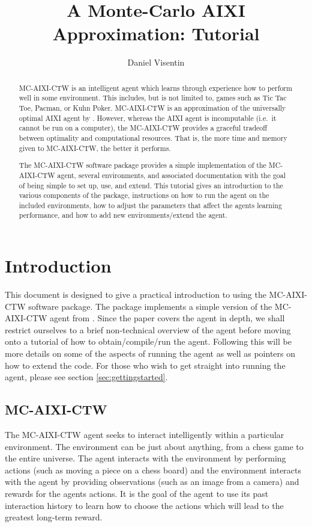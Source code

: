 \documentclass[a4paper,11pt]{article}
\title{A Monte-Carlo AIXI Approximation: Tutorial}
\author{Daniel Visentin}
\begin{document}
\maketitle 

\tableofcontents

\newpage

\begin{abstract}
  MC-AIXI-CTW is an intelligent agent which learns through experience how to perform well in some environment. This includes, but is not limited to, games such as Tic Tac Toe, Pacman, or Kuhn Poker. MC-AIXI-CTW is an approximation of the universally optimal AIXI agent by \cite{hutter2005universal}. However, whereas the AIXI agent is incomputable (i.e.~it cannot be run on a computer), the MC-AIXI-CTW provides a graceful tradeoff between optimality and computational resources. That is, the more time and memory given to MC-AIXI-CTW, the better it performs.

The MC-AIXI-CTW software package provides a simple implementation of the MC-AIXI-CTW agent, several environments, and associated documentation with the goal of being simple to set up, use, and extend. This tutorial gives an introduction to the various components of the package, instructions on how to run the agent on the included environments, how to adjust the parameters that affect the agents learning performance, and how to add new environments/extend the agent.

\end{abstract}

\section{Introduction}
This document is designed to give a practical introduction to using the MC-AIXI-CTW software package. The package implements a simple version of the MC-AIXI-CTW agent from \cite{Hutter:11aixictwx}. Since the paper covers the agent in depth, we shall restrict ourselves to a brief non-technical overview of the agent before moving onto a tutorial of how to obtain/compile/run the agent. Following this will be more details on some of the aspects of running the agent as well as pointers on how to extend the code. For those who wish to get straight into running the agent, please see section \ref{sec:gettingstarted}.

\subsection{MC-AIXI-CTW}
The MC-AIXI-CTW agent seeks to interact intelligently within a particular environment. The environment can be just about anything, from a chess game to the entire universe. The agent interacts with the environment by performing actions (such as moving a piece on a chess board) and the environment interacts with the agent by providing observations (such as an image from a camera) and rewards for the agents actions. It is the goal of the agent to use its past interaction history to learn how to choose the actions which will lead to the greatest long-term reward.
\end{document}
